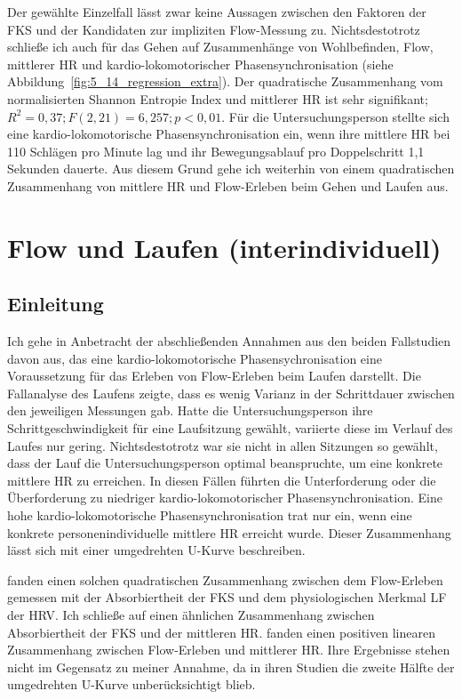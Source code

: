 Der gewählte Einzelfall lässt zwar keine Aussagen zwischen den Faktoren der \ac{FKS} und der Kandidaten zur impliziten Flow-Messung zu. Nichtsdestotrotz schließe ich auch für das Gehen auf Zusammenhänge von Wohlbefinden, Flow, mittlerer \ac{HR} und kardio-lokomotorischer Phasensynchronisation (siehe Abbildung~\ref{fig:5_14_regression_extra}). Der quadratische Zusammenhang vom normalisierten Shannon Entropie Index und mittlerer \ac{HR} ist sehr signifikant; $R^2 = 0{,}37; F(2, 21) = 6,257; p < 0{,}01$. Für die Untersuchungsperson stellte sich eine kardio-lokomotorische Phasensynchronisation ein, wenn ihre mittlere \ac{HR} bei 110 Schlägen pro Minute lag und ihr Bewegungsablauf pro Doppelschritt 1,1 Sekunden dauerte. Aus diesem Grund gehe ich weiterhin von einem quadratischen Zusammenhang von mittlere \ac{HR} und Flow-Erleben beim Gehen und Laufen aus.

\section{Flow und Laufen (interindividuell)}
\label{sec:flow_und_laufen_interindividuell}

\subsection{Einleitung}

Ich gehe in Anbetracht der abschließenden Annahmen aus den beiden Fallstudien davon aus, das eine kardio-lokomotorische Phasensychronisation eine Voraussetzung für das Erleben von Flow-Erleben beim Laufen darstellt. Die Fallanalyse des Laufens zeigte, dass es wenig Varianz in der Schrittdauer zwischen den jeweiligen Messungen gab. Hatte die Untersuchungsperson ihre Schrittgeschwindigkeit für eine Laufsitzung gewählt, variierte diese im Verlauf des Laufes nur gering. Nichtsdestotrotz war sie nicht in allen Sitzungen so gewählt, dass der Lauf die Untersuchungsperson optimal beanspruchte, um eine konkrete mittlere \ac{HR} zu erreichen. In diesen Fällen führten die Unterforderung oder die Überforderung zu niedriger kardio-lokomotorischer Phasensynchronisation. Eine hohe kardio-lokomotorische Phasensynchronisation trat nur ein, wenn eine konkrete personenindividuelle mittlere \ac{HR} erreicht wurde. Dieser Zusammenhang lässt sich mit einer umgedrehten U-Kurve beschreiben. 

\citet{Peifer2014} fanden einen solchen quadratischen Zusammenhang zwischen dem Flow-Erleben gemessen mit der Absorbiertheit der \ac{FKS} und dem physiologischen Merkmal \ac{LF} der \ac{HRV}. Ich schließe auf einen ähnlichen Zusammenhang zwischen Absorbiertheit der \ac{FKS} und der mittleren \ac{HR}. \citet{deManzano2010, Gaggioli2013} fanden einen positiven linearen Zusammenhang zwischen Flow-Erleben und mittlerer \ac{HR}. Ihre Ergebnisse stehen nicht im Gegensatz zu meiner Annahme, da in ihren Studien die zweite Hälfte der umgedrehten U-Kurve unberücksichtigt blieb.

